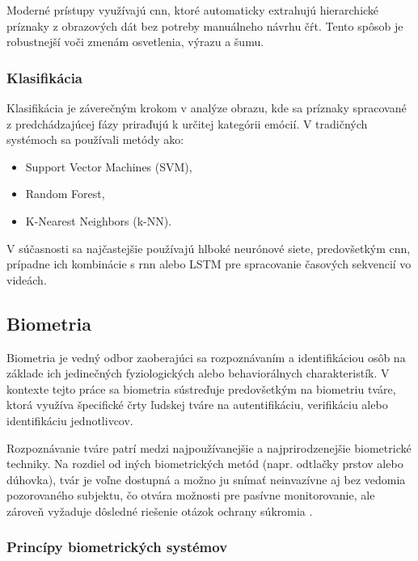 Moderné prístupy využívajú \gls{cnn}, ktoré automaticky extrahujú hierarchické príznaky z obrazových dát bez potreby manuálneho návrhu čŕt. Tento spôsob je robustnejší voči zmenám osvetlenia, výrazu a šumu.

\subsubsection{Klasifikácia}
Klasifikácia je záverečným krokom v analýze obrazu, kde sa príznaky spracované z predchádzajúcej fázy priraďujú k určitej kategórii emócií. V tradičných systémoch sa používali metódy ako:
\begin{itemize}
    \item Support Vector Machines (SVM),
    \item Random Forest,
    \item K-Nearest Neighbors (k-NN).
\end{itemize}

V súčasnosti sa najčastejšie používajú hlboké neurónové siete, predovšetkým \gls{cnn}, prípadne ich kombinácie s \gls{rnn} alebo LSTM pre spracovanie časových sekvencií vo videách.

\subsection{Biometria}

Biometria je vedný odbor zaoberajúci sa rozpoznávaním a identifikáciou osôb na základe ich jedinečných fyziologických alebo behaviorálnych charakteristík. V kontexte tejto práce sa biometria sústreďuje predovšetkým na biometriu tváre, ktorá využíva špecifické črty ľudskej tváre na autentifikáciu, verifikáciu alebo identifikáciu jednotlivcov.

Rozpoznávanie tváre patrí medzi najpoužívanejšie a najprirodzenejšie biometrické techniky. Na rozdiel od iných biometrických metód (napr. odtlačky prstov alebo dúhovka), tvár je voľne dostupná a možno ju snímať neinvazívne aj bez vedomia pozorovaného subjektu, čo otvára možnosti pre pasívne monitorovanie, ale zároveň vyžaduje dôsledné riešenie otázok ochrany súkromia\cite{inProceedings01} \cite{article03}.

\subsubsection{Princípy biometrických systémov}


